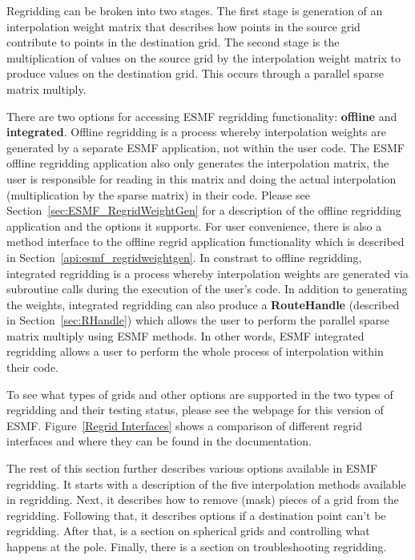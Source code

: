  Regridding can be broken into two stages. The first stage is generation of an interpolation weight matrix that describes how points in 
 the source grid contribute to points in the destination grid. The second stage is the multiplication of values on the source grid by the
 interpolation weight matrix to produce values on the destination grid. This occurs through a parallel sparse matrix multiply.

 There are two options for accessing ESMF regridding functionality: {\bf offline} and {\bf integrated}. Offline regridding is a process whereby interpolation 
 weights are generated by a separate ESMF application, not within the user code. The ESMF offline regridding application also only generates the interpolation 
 matrix, the user is responsible for reading in this matrix and doing the actual interpolation (multiplication by the sparse matrix) in their code.
 Please see Section~\ref{sec:ESMF_RegridWeightGen} for a description of the offline regridding application and the options it supports. For user convenience, there
 is also a method interface to the offline regrid application functionality which is described in Section~\ref{api:esmf_regridweightgen}.
 In constrast to offline regridding, integrated regridding is a process whereby interpolation weights are generated via subroutine calls during the
 execution of the user's code. In addition to generating the weights, integrated regridding can also produce a {\bf RouteHandle} (described in Section~\ref{sec:RHandle}) which allows the user to perform the parallel sparse 
 matrix multiply using ESMF methods. In other words, ESMF integrated regridding allows a user to perform the whole process of interpolation within their code. 

 To see what types of grids and other options are supported in the two types of regridding and their testing status, please see the  webpage for this version of ESMF.
 Figure~\ref{Regrid Interfaces} shows a comparison of different regrid interfaces and where they can be found in the documentation. 

 The rest of this section further describes various options available in ESMF regridding. It starts with a description of the five interpolation methods available in regridding.
 Next, it describes how to remove (mask) pieces of a grid from the regridding. Following that, it describes options if a destination point can't be regridding. After that, is a section
 on spherical grids and controlling what happens at the pole. Finally, there is a section on troubleshooting regridding.  

